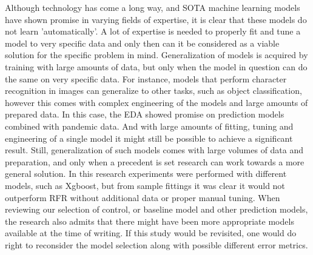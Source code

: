 Although technology has come a long way, and SOTA machine learning models have shown promise in varying fields of expertise, it is clear that these models do not learn 'automatically'. A lot of expertise is needed to properly fit and tune a model to very specific data and only then can it be considered as a viable solution for the specific problem in mind. Generalization of models is acquired by training with large amounts of data, but only when the model in question can do the same on very specific data. For instance, models that perform character recognition in images can generalize to other tasks, such as object classification, however this comes with complex engineering of the models and large amounts of prepared data. In this case, the EDA showed promise on prediction models combined with pandemic data. And with large amounts of fitting, tuning and engineering of a single model it might still be possible to achieve a significant result. Still, generalization of such models comes with large volumes of data and preparation, and only when a precedent is set research can work towards a more general solution. In this research experiments were performed with different models, such as Xgboost, but from sample fittings it was clear it would not outperform RFR without additional data or proper manual tuning.
When reviewing our selection of control, or baseline model and other prediction models, the research also admits that there might have been more appropriate models available at the time of writing. If this study would be revisited, one would do right to reconsider the model selection along with possible different error metrics.

